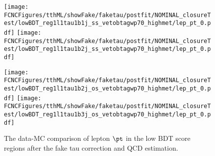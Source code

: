 \begin{figure}[H]
\centering
\texttt{[image: \\FCNCFigures/tthML/showFake/faketau/postfit/NOMINAL\_closureTest/lowBDT\_reg1l1tau1b1j\_ss\_vetobtagwp70\_highmet/lep\_pt\_0.pdf]}
\texttt{[image: \\FCNCFigures/tthML/showFake/faketau/postfit/NOMINAL\_closureTest/lowBDT\_reg1l1tau1b2j\_ss\_vetobtagwp70\_highmet/lep\_pt\_0.pdf]}

\texttt{[image: \\FCNCFigures/tthML/showFake/faketau/postfit/NOMINAL\_closureTest/lowBDT\_reg1l1tau1b2j\_os\_vetobtagwp70\_highmet/lep\_pt\_0.pdf]}
\texttt{[image: \\FCNCFigures/tthML/showFake/faketau/postfit/NOMINAL\_closureTest/lowBDT\_reg1l1tau1b3j\_os\_vetobtagwp70\_highmet/lep\_pt\_0.pdf]}


\caption{ The data-MC comparison of lepton $\pt$ in the low BDT score regions after the fake tau correction and QCD estimation. }
\label{fig:closuretest}
\end{figure}
